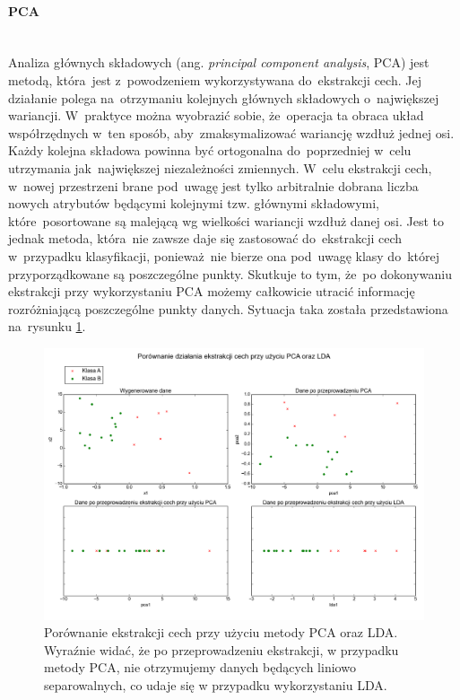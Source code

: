 \paragraph{PCA}\mbox{}\\
Analiza głównych składowych (ang. \textit{principal component analysis}, PCA)\cite{pcaReference} jest metodą, która~jest z~powodzeniem wykorzystywana do~ekstrakcji cech. Jej działanie polega na~otrzymaniu kolejnych głównych składowych o~największej wariancji. W~praktyce można wyobrazić sobie, że~operacja ta obraca układ współrzędnych w~ten sposób, aby~zmaksymalizować wariancję wzdłuż jednej osi. Każdy kolejna składowa powinna być ortogonalna do~poprzedniej w~celu utrzymania jak~największej niezależności zmiennych. W~celu ekstrakcji cech, w~nowej przestrzeni brane pod~uwagę jest tylko arbitralnie dobrana liczba nowych atrybutów będącymi kolejnymi tzw. głównymi składowymi, które~posortowane są malejącą wg wielkości wariancji wzdłuż danej osi. Jest to jednak metoda, która~nie zawsze daje się zastosować do~ekstrakcji cech w~przypadku klasyfikacji, ponieważ~nie bierze ona pod~uwagę klasy do~której przyporządkowane są poszczególne punkty. Skutkuje to tym, że~po dokonywaniu ekstrakcji przy wykorzystaniu PCA możemy całkowicie utracić informację rozróżniającą poszczególne punkty danych. Sytuacja taka została przedstawiona na~rysunku \ref{pcaIsShit}.


\begin{figure}[ht!]
\centering
\includegraphics[scale=0.5]{res/pcalda.png}
\caption[Caption for LOF]{Porównanie ekstrakcji cech przy użyciu metody PCA oraz LDA. Wyraźnie widać, że po przeprowadzeniu ekstrakcji, w przypadku metody PCA, nie otrzymujemy danych będących liniowo separowalnych, co udaje się w przypadku wykorzystaniu LDA.} \label{pcaIsShit} 
\end{figure}


